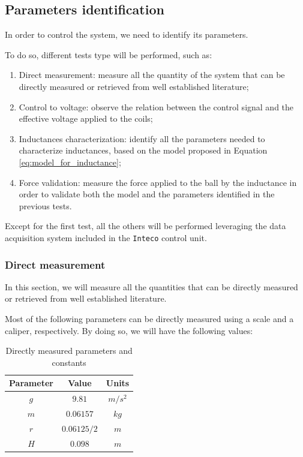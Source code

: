 \subsection{Parameters identification}
\label{subsec:parameters_identification}

In order to control the system, we need to identify its parameters.

To do so, different tests type will be performed, such as:

\begin{enumerate}
    \item Direct measurement: measure all the quantity of the system that can be directly measured or retrieved from well established literature;
    \item Control to voltage: observe the relation between the control signal and the effective voltage applied to the coils;
    \item Inductances characterization: identify all the parameters needed to characterize inductances, based on the model proposed in Equation \ref{eq:model_for_inductance};
    \item Force validation: measure the force applied to the ball by the inductance in order to validate both the model and the parameters identified in the previous tests.
\end{enumerate}

Except for the first test, all the others will be performed leveraging the data acquisition system included in the \texttt{Inteco} control unit.

\subsubsection{Direct measurement}
\label{subsubsec:direct_measurement}

In this section, we will measure all the quantities that can be directly measured or retrieved from well established literature.

Most of the following parameters can be directly measured using a scale and a caliper, respectively.
By doing so, we will have the following values:

\begin{table}[H]

    \centering
    \begin{tabular}{|c|c|c|}
        \hline
        \textbf{Parameter} & \textbf{Value} & \textbf{Units} \\
        \hline
        $g$                & $9.81$         & $m/s^2$        \\
        $m$                & $0.06157$      & $kg$           \\
        $r$                & $0.06125/2$    & $m$            \\
        $H$                & $0.098$        & $m$            \\
        \hline
    \end{tabular}

    \caption{Directly measured parameters and constants}
    \label{tab:directly_measured_parameters}

\end{table}

